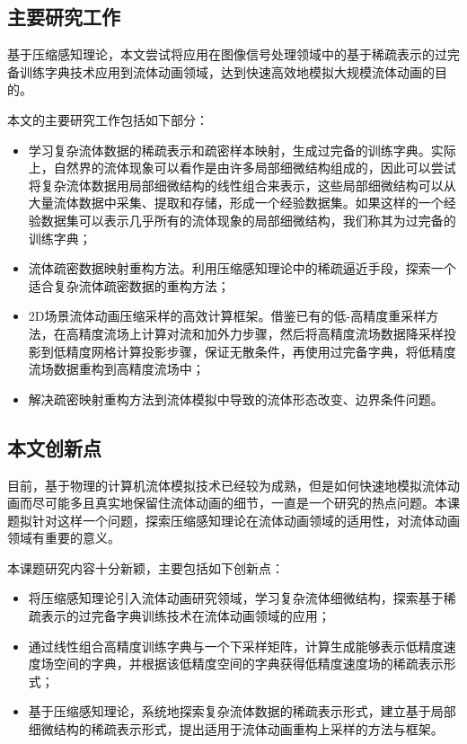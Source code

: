 \subsection{主要研究工作}

基于压缩感知理论，本文尝试将应用在图像信号处理领域中的基于稀疏表示的过完备训练字典技术应用到流体动画领域，达到快速高效地模拟大规模流体动画的目的。

本文的主要研究工作包括如下部分：
\begin{itemize}
\item 学习复杂流体数据的稀疏表示和疏密样本映射，生成过完备的训练字典。实际上，自然界的流体现象可以看作是由许多局部细微结构组成的，因此可以尝试将复杂流体数据用局部细微结构的线性组合来表示，这些局部细微结构可以从大量流体数据中采集、提取和存储，形成一个经验数据集。如果这样的一个经验数据集可以表示几乎所有的流体现象的局部细微结构，我们称其为过完备的训练字典；
\item 流体疏密数据映射重构方法。利用压缩感知理论中的稀疏逼近手段，探索一个适合复杂流体疏密数据的重构方法；
\item 2D场景流体动画压缩采样的高效计算框架。借鉴已有的低-高精度重采样方法，在高精度流场上计算对流和加外力步骤，然后将高精度流场数据降采样投影到低精度网格计算投影步骤，保证无散条件，再使用过完备字典，将低精度流场数据重构到高精度流场中；
\item 解决疏密映射重构方法到流体模拟中导致的流体形态改变、边界条件问题。
\end{itemize}

\subsection{本文创新点}

目前，基于物理的计算机流体模拟技术已经较为成熟，但是如何快速地模拟流体动画而尽可能多且真实地保留住流体动画的细节，一直是一个研究的热点问题。本课题拟针对这样一个问题，探索压缩感知理论在流体动画领域的适用性，对流体动画领域有重要的意义。

本课题研究内容十分新颖，主要包括如下创新点：
\begin{itemize}
\item 将压缩感知理论引入流体动画研究领域，学习复杂流体细微结构，探索基于稀疏表示的过完备字典训练技术在流体动画领域的应用；
\item 通过线性组合高精度训练字典与一个下采样矩阵，计算生成能够表示低精度速度场空间的字典，并根据该低精度空间的字典获得低精度速度场的稀疏表示形式；
\item 基于压缩感知理论，系统地探索复杂流体数据的稀疏表示形式，建立基于局部细微结构的稀疏表示形式，提出适用于流体动画重构上采样的方法与框架。
\end{itemize}

